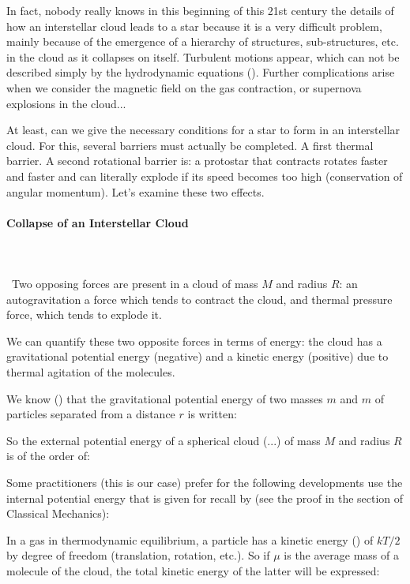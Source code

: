 	In fact, nobody really knows in this beginning of this 21st century the details of how an interstellar cloud leads to a star because it is a very difficult problem, mainly because of the emergence of a hierarchy of structures, sub-structures, etc. in the cloud as it collapses on itself. Turbulent motions appear, which can not be described simply by the hydrodynamic equations (). Further complications arise when we consider the magnetic field on the gas contraction, or supernova explosions in the cloud...

	At least, can we give the necessary conditions for a star to form in an interstellar cloud. For this, several barriers must actually be completed. A first thermal barrier. A second rotational barrier is: a protostar that contracts rotates faster and faster and can literally explode if its speed becomes too high (conservation of angular momentum). Let's examine these two effects.
	
	
	\paragraph{Collapse of an Interstellar Cloud}\mbox{}\\\\\
	Two opposing forces are present in a cloud of mass $M$ and radius $R$: an autogravitation a force which tends to contract the cloud, and thermal pressure force, which tends to explode it.
	
	We can quantify these two opposite forces in terms of energy: the cloud has a gravitational potential energy (negative) and a kinetic energy (positive) due to thermal agitation of the molecules.

	We know () that the gravitational potential energy of two masses $m$ and $m$ of particles separated from a distance $r$ is written:
	
	So the external potential energy of a spherical cloud (...) of mass $M$ and radius $R$ is of the order of:
	
	\begin{tcolorbox}[title=Remark,colframe=black,arc=10pt]
	Some practitioners (this is our case) prefer for the following developments use the internal potential energy that is given for recall by (see the proof in the section of Classical Mechanics):
	
	\end{tcolorbox}
	In a gas in thermodynamic equilibrium, a particle has a kinetic energy () of $kT/2$ by degree of freedom (translation, rotation, etc.). So if $\mu$ is the average mass of a molecule of the cloud, the total kinetic energy of the latter will be expressed:
	
